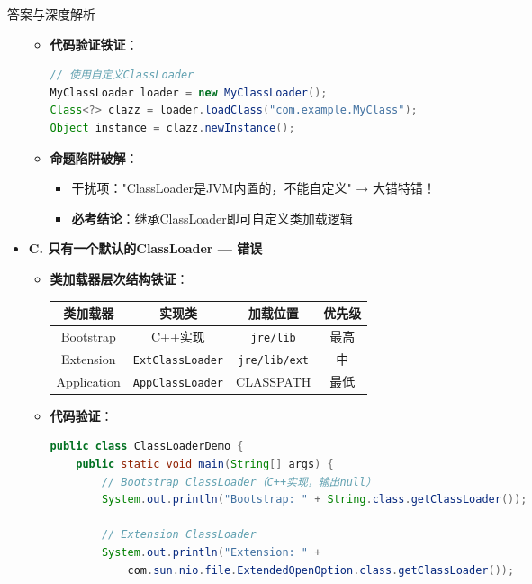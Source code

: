 \documentclass[12pt, a4paper]{ctexart}
\begin{document}
\begin{bluebox}{答案与深度解析}
\begin{itemize}[label={}, leftmargin=*, nosep]
\begin{itemize}[label={}, leftmargin=*, nosep]
	\item \textbf{代码验证铁证}：
	      \begin{lstlisting}[language=Java]
// 使用自定义ClassLoader
MyClassLoader loader = new MyClassLoader();
Class<?> clazz = loader.loadClass("com.example.MyClass");
Object instance = clazz.newInstance();
      \end{lstlisting}

	\item \textbf{命题陷阱破解}：
	      \begin{itemize}[label={}, nosep]
		      \item 干扰项："ClassLoader是JVM内置的，不能自定义" → 大错特错！
		      \item \textbf{必考结论}：继承ClassLoader即可自定义类加载逻辑
	      \end{itemize}
\end{itemize}

\item \textbf{C. 只有一个默认的ClassLoader — 错误}
\begin{itemize}[label={}, leftmargin=*, nosep]
	\item \textbf{类加载器层次结构铁证}：
	      \begin{center}
		      \begin{tabular}{|c|c|c|c|}
			      \hline
			      \textbf{类加载器} & \textbf{实现类}            & \textbf{加载位置}        & \textbf{优先级} \\
			      \hline
			      Bootstrap     & C++实现                   & \texttt{jre/lib}     & 最高           \\
			      \hline
			      Extension     & \texttt{ExtClassLoader} & \texttt{jre/lib/ext} & 中            \\
			      \hline
			      Application   & \texttt{AppClassLoader} & CLASSPATH            & 最低           \\
			      \hline
		      \end{tabular}
	      \end{center}

	\item \textbf{代码验证}：
	      \begin{lstlisting}[language=Java]
public class ClassLoaderDemo {
    public static void main(String[] args) {
        // Bootstrap ClassLoader（C++实现，输出null）
        System.out.println("Bootstrap: " + String.class.getClassLoader());
        
        // Extension ClassLoader
        System.out.println("Extension: " + 
            com.sun.nio.file.ExtendedOpenOption.class.getClassLoader());
        

\end{lstlisting}
\end{itemize}
\end{itemize}
\end{bluebox}
\end{document}
